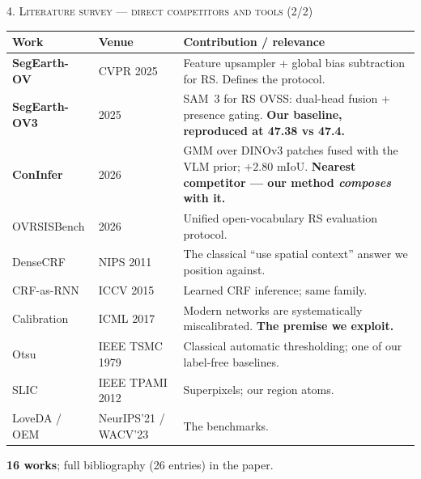 \documentclass[aspectratio=169]{beamer}
\newcommand{\best}[1]{\textcolor{acc}{\textbf{#1}}}
\begin{document}
\begin{frame}{\textsc{4. Literature survey --- direct competitors and tools (2/2)}}
\scriptsize
\begin{tabular}{@{}p{2.5cm}p{2.0cm}p{8.4cm}@{}}
\toprule
\textbf{Work} & \textbf{Venue} & \textbf{Contribution / relevance} \\
\midrule
\best{SegEarth-OV} \cite{segearthov} & CVPR 2025 & Feature upsampler + global bias subtraction for RS. Defines the protocol. \\
\best{SegEarth-OV3} \cite{segearthov3} & 2025 & SAM~3 for RS OVSS: dual-head fusion + presence gating. \best{Our baseline, reproduced at 47.38 vs 47.4.} \\
\best{ConInfer} \cite{coninfer} & 2026 & GMM over DINOv3 patches fused with the VLM prior; $+2.80$ mIoU. \best{Nearest competitor --- our method \emph{composes} with it.} \\
OVRSISBench \cite{ovrsisbench} & 2026 & Unified open-vocabulary RS evaluation protocol. \\
DenseCRF \cite{densecrf} & NIPS 2011 & The classical ``use spatial context'' answer we position against. \\
CRF-as-RNN \cite{crfasrnn} & ICCV 2015 & Learned CRF inference; same family. \\
Calibration \cite{calibration} & ICML 2017 & Modern networks are systematically miscalibrated. \best{The premise we exploit.} \\
Otsu \cite{otsu} & IEEE TSMC 1979 & Classical automatic thresholding; one of our label-free baselines. \\
SLIC \cite{slic} & IEEE TPAMI 2012 & Superpixels; our region atoms. \\
LoveDA \cite{loveda} / OEM \cite{openearthmap} & NeurIPS'21 / WACV'23 & The benchmarks. \\
\bottomrule
\end{tabular}
\vspace{0.4em}
\footnotesize \textbf{16 works}; full bibliography (26 entries) in the paper.
\end{frame}

\end{document}

